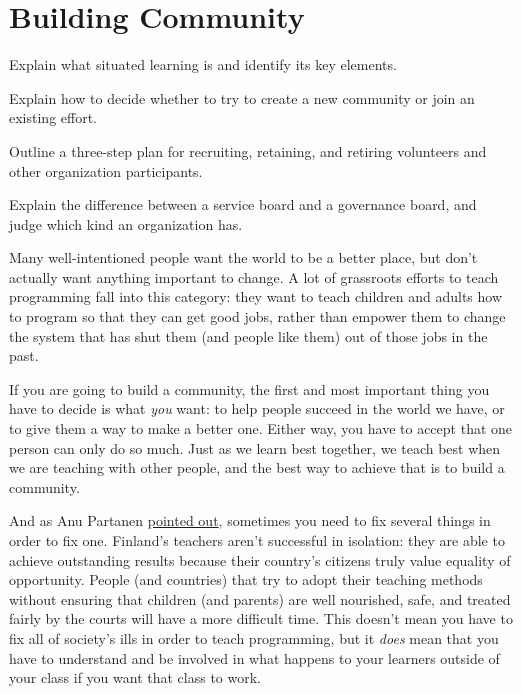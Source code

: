 \chapter{Building Community}\label{s:community}

\begin{objectives}

\item Explain what situated learning is and identify its key elements.

\item Explain how to decide whether to try to create a new community
  or join an existing effort.

\item Outline a three-step plan for recruiting, retaining, and
  retiring volunteers and other organization participants.

\item Explain the difference between a service board and a governance
  board, and judge which kind an organization has.

\end{objectives}

Many well-intentioned people want the world to be a better place, but
don't actually want anything important to change. A lot of grassroots
efforts to teach programming fall into this category: they want to teach
children and adults how to program so that they can get good jobs,
rather than empower them to change the system that has shut them (and
people like them) out of those jobs in the past.

If you are going to build a community, the first and most important
thing you have to decide is what \emph{you} want: to help people
succeed in the world we have, or to give them a way to make a better
one.  Either way, you have to accept that one person can only do so
much. Just as we learn best together, we teach best when we are
teaching with other people, and the best way to achieve that is to
build a community.

And as Anu Partanen
\href{https://www.theatlantic.com/national/archive/2011/12/what-americans-keep-ignoring-about-finlands-school-success/250564/}{pointed
  out}, sometimes you need to fix several things in order to fix one.
Finland's teachers aren't successful in isolation: they are able to
achieve outstanding results because their country's citizens truly
value equality of opportunity.  People (and countries) that try to
adopt their teaching methods without ensuring that children (and
parents) are well nourished, safe, and treated fairly by the courts
will have a more difficult time.  This doesn't mean you have to fix
all of society's ills in order to teach programming, but it
\emph{does} mean that you have to understand and be involved in what
happens to your learners outside of your class if you want that class
to work.

